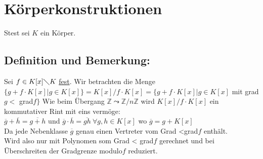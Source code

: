 \section{Körperkonstruktionen}
Stest sei $K$ ein Körper.
%
%
%
\subsection{Definition und Bemerkung:}
Sei $f \in K[x] \diagdown K$ \underline{fest}. Wir betrachten die Menge $\{g + f \cdot K[x]|g \in K[x]\} = K[x]/f \cdot K[x] = \{g+f\cdot K[x]|g \in K[x]$ mit grad$g <$ grad$f\}$ Wie beim Übergang $\mathbb{Z}\leadsto\mathbb{Z}/n\mathbb{Z}$ wird $K[x]/f \cdot K[x]$ ein kommutativer Rint mit eins vermöge: \\
$\overline{g} + \overline{h} = \overline{g+h}$ und $\overline{g} \cdot \overline{h} = \overline{gh} \ \forall g,h \in K[x]$ wo $ \overline{g} = g + K[x]$\\
Da jede Nebenklasse $\overline{g}$ genau einen Vertreter vom Grad <grad$f$ enthält.\\
Wird also nur mit Polynomen som Grad < grad$f$ gerechnet und bei Überschreiten der Gradgrenze modulo$f$ reduziert. 